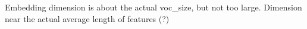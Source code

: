 Embedding dimension is about the actual voc\_size, but not too large.
Dimension near the actual average length of features (?)

